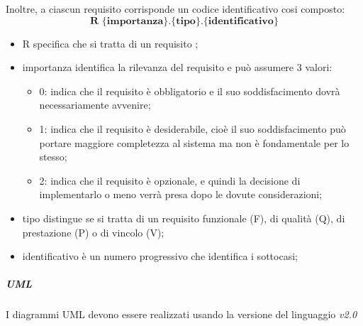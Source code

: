 Inoltre, a ciascun requisito corrisponde un codice identificativo cosi composto: 
$$ \textbf{R \{importanza\}.\{tipo\}.\{identificativo\}  } $$ 
\begin{itemize}
	\item R specifica che si tratta di un requisito ; 	
	\item importanza identifica la rilevanza del requisito e può assumere 3 valori:
	\begin{itemize}
		\item 0: indica che il requisito è obbligatorio e il suo soddisfacimento dovrà necessariamente avvenire;  	
		\item 1: indica che il requisito è desiderabile, cioè il suo soddisfacimento può portare maggiore completezza al sistema ma non è fondamentale per lo stesso; 	
		\item 2: indica che il requisito è opzionale, e quindi la decisione di implementarlo o meno verrà presa dopo le dovute considerazioni; 	
	\end{itemize} 	
	\item tipo distingue se si tratta di un requisito funzionale (F), di qualità (Q), di prestazione (P) o di vincolo (V); 	
	\item identificativo è un numero progressivo che identifica i sottocasi; 	
\end{itemize}
\subparagraph{UML}\Spazio
I diagrammi UML devono essere realizzati usando la versione del linguaggio \emph{v2.0}
